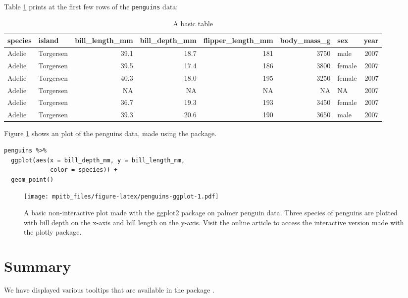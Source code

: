 Table \ref{tab:penguins-tab-static} prints at the first few rows of the \texttt{penguins} data:

\begin{table}

\caption{\label{tab:penguins-tab-static}A basic table}
\centering
\fontsize{7}{9}\selectfont
\begin{tabular}[t]{l|l|r|r|r|r|l|r}
\hline
species & island & bill\_length\_mm & bill\_depth\_mm & flipper\_length\_mm & body\_mass\_g & sex & year\\
\hline
Adelie & Torgersen & 39.1 & 18.7 & 181 & 3750 & male & 2007\\
\hline
Adelie & Torgersen & 39.5 & 17.4 & 186 & 3800 & female & 2007\\
\hline
Adelie & Torgersen & 40.3 & 18.0 & 195 & 3250 & female & 2007\\
\hline
Adelie & Torgersen & NA & NA & NA & NA & NA & 2007\\
\hline
Adelie & Torgersen & 36.7 & 19.3 & 193 & 3450 & female & 2007\\
\hline
Adelie & Torgersen & 39.3 & 20.6 & 190 & 3650 & male & 2007\\
\hline
\end{tabular}
\end{table}

Figure \ref{fig:penguins-ggplot} shows an plot of the penguins data, made using the  package.

\begin{verbatim}
penguins %>% 
  ggplot(aes(x = bill_depth_mm, y = bill_length_mm, 
             color = species)) + 
  geom_point()
\end{verbatim}

\begin{figure}
\centering
\texttt{[image: mpitb\_files/figure-latex/penguins-ggplot-1.pdf]}
\caption{\label{fig:penguins-ggplot}A basic non-interactive plot made with the ggplot2 package on palmer penguin data. Three species of penguins are plotted with bill depth on the x-axis and bill length on the y-axis. Visit the online article to access the interactive version made with the plotly package.}
\end{figure}

\hypertarget{summary}{%
\section{Summary}\label{summary}}

We have displayed various tooltips that are available in the package .

